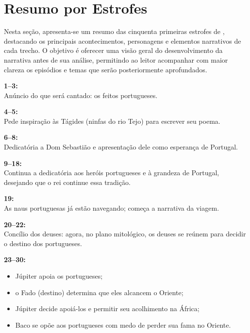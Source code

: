 \section{Resumo por Estrofes}

Nesta seção, apresenta-se um resumo das cinquenta primeiras estrofes de
\cite{camoes_lusiadas}, destacando os principais
acontecimentos, personagens e elementos narrativos de cada trecho. O objetivo é
oferecer uma visão geral do desenvolvimento da narrativa antes de sua análise,
permitindo ao leitor acompanhar com maior clareza os episódios e temas que
serão posteriormente aprofundados.

\medskip

\textbf{1--3:}\\
Anúncio do que será cantado: os feitos portugueses.

\medskip

\textbf{4--5:}\\
Pede inspiração às Tágides (ninfas do rio Tejo) para escrever seu poema.

\medskip

\textbf{6--8:}\\
Dedicatória a Dom Sebastião e apresentação dele como esperança de Portugal.

\medskip

\textbf{9--18:}\\
Continua a dedicatória aos heróis portugueses e à grandeza de Portugal,
desejando que o rei continue essa tradição.

\medskip

\textbf{19:}\\
As naus portuguesas já estão navegando; começa a narrativa da viagem.

\medskip

\textbf{20--22:}\\
Concílio dos deuses: agora, no plano mitológico, os deuses se reúnem para
decidir o destino dos portugueses.

\medskip

\textbf{23--30:}
\begin{itemize}
    \item Júpiter apoia os portugueses;
    \item o Fado (destino) determina que eles alcancem o Oriente;
    \item Júpiter decide apoiá-los e permitir seu acolhimento na África;
    \item Baco se opõe aos portugueses com medo de perder sua fama no Oriente.
\end{itemize}

